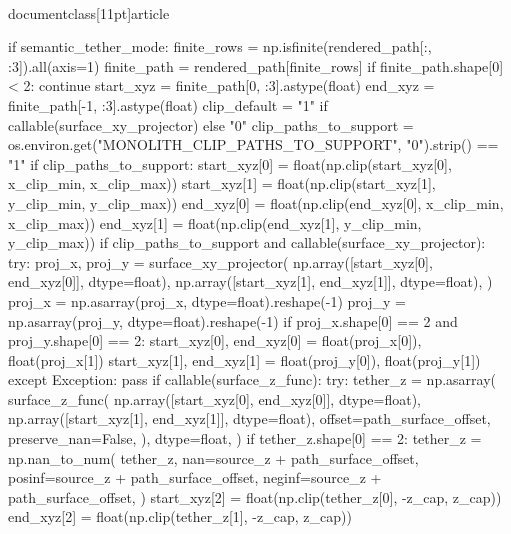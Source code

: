 \\documentclass[11pt]{article}
\begin{document}
\begin{CodeBlock}
{{        if semantic_tether_mode:
            finite_rows = np.isfinite(rendered_path[:, :3]).all(axis=1)
            finite_path = rendered_path[finite_rows]
            if finite_path.shape[0] < 2:
                continue
            start_xyz = finite_path[0, :3].astype(float)
            end_xyz = finite_path[-1, :3].astype(float)
            clip_default = "1" if callable(surface_xy_projector) else "0"
            clip_paths_to_support = os.environ.get("MONOLITH_CLIP_PATHS_TO_SUPPORT", "0").strip() == "1"
            if clip_paths_to_support:
                start_xyz[0] = float(np.clip(start_xyz[0], x_clip_min, x_clip_max))
                start_xyz[1] = float(np.clip(start_xyz[1], y_clip_min, y_clip_max))
                end_xyz[0] = float(np.clip(end_xyz[0], x_clip_min, x_clip_max))
                end_xyz[1] = float(np.clip(end_xyz[1], y_clip_min, y_clip_max))
            if clip_paths_to_support and callable(surface_xy_projector):
                try:
                    proj_x, proj_y = surface_xy_projector(
                        np.array([start_xyz[0], end_xyz[0]], dtype=float),
                        np.array([start_xyz[1], end_xyz[1]], dtype=float),
                    )
                    proj_x = np.asarray(proj_x, dtype=float).reshape(-1)
                    proj_y = np.asarray(proj_y, dtype=float).reshape(-1)
                    if proj_x.shape[0] == 2 and proj_y.shape[0] == 2:
                        start_xyz[0], end_xyz[0] = float(proj_x[0]), float(proj_x[1])
                        start_xyz[1], end_xyz[1] = float(proj_y[0]), float(proj_y[1])
                except Exception:
                    pass
            if callable(surface_z_func):
                try:
                    tether_z = np.asarray(
                        surface_z_func(
                            np.array([start_xyz[0], end_xyz[0]], dtype=float),
                            np.array([start_xyz[1], end_xyz[1]], dtype=float),
                            offset=path_surface_offset,
                            preserve_nan=False,
                        ),
                        dtype=float,
                    )
                    if tether_z.shape[0] == 2:
                        tether_z = np.nan_to_num(
                            tether_z,
                            nan=source_z + path_surface_offset,
                            posinf=source_z + path_surface_offset,
                            neginf=source_z + path_surface_offset,
                        )
                        start_xyz[2] = float(np.clip(tether_z[0], -z_cap, z_cap))
                        end_xyz[2] = float(np.clip(tether_z[1], -z_cap, z_cap))
}}
\end{CodeBlock}
\end{document}
